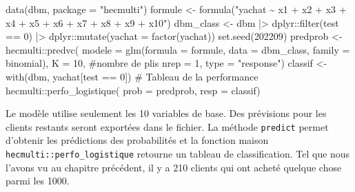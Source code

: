 \documentclass[
  11pt,
  letterpaper,
]{scrbook}
\newenvironment{Shaded}{\begin{snugshade}}{\end{snugshade}}
\newcommand{\AttributeTok}[1]{\textcolor[rgb]{0.40,0.45,0.13}{#1}}
\newcommand{\CommentTok}[1]{\textcolor[rgb]{0.37,0.37,0.37}{#1}}
\newcommand{\DecValTok}[1]{\textcolor[rgb]{0.68,0.00,0.00}{#1}}
\newcommand{\FunctionTok}[1]{\textcolor[rgb]{0.28,0.35,0.67}{#1}}
\newcommand{\NormalTok}[1]{\textcolor[rgb]{0.00,0.23,0.31}{#1}}
\newcommand{\OtherTok}[1]{\textcolor[rgb]{0.00,0.23,0.31}{#1}}
\newcommand{\SpecialCharTok}[1]{\textcolor[rgb]{0.37,0.37,0.37}{#1}}
\newcommand{\StringTok}[1]{\textcolor[rgb]{0.13,0.47,0.30}{#1}}
\theoremstyle{definition}
\theoremstyle{remark}
\begin{document}
\begin{Shaded}
\begin{Highlighting}[]
\FunctionTok{data}\NormalTok{(dbm, }\AttributeTok{package =} \StringTok{"hecmulti"}\NormalTok{)}
\NormalTok{formule }\OtherTok{\textless{}{-}} \FunctionTok{formula}\NormalTok{(}\StringTok{"yachat \textasciitilde{} x1 + x2 + x3 +}
\StringTok{                x4 + x5 + x6 + x7 + x8 + x9 + x10"}\NormalTok{)}
\NormalTok{dbm\_class }\OtherTok{\textless{}{-}}\NormalTok{ dbm }\SpecialCharTok{|\textgreater{}}
\NormalTok{  dplyr}\SpecialCharTok{::}\FunctionTok{filter}\NormalTok{(test }\SpecialCharTok{==} \DecValTok{0}\NormalTok{) }\SpecialCharTok{|\textgreater{}}
\NormalTok{  dplyr}\SpecialCharTok{::}\FunctionTok{mutate}\NormalTok{(}\AttributeTok{yachat =} \FunctionTok{factor}\NormalTok{(yachat))}
\FunctionTok{set.seed}\NormalTok{(}\DecValTok{202209}\NormalTok{)}
\NormalTok{predprob }\OtherTok{\textless{}{-}}\NormalTok{ hecmulti}\SpecialCharTok{::}\FunctionTok{predvc}\NormalTok{(}
  \AttributeTok{modele =} \FunctionTok{glm}\NormalTok{(}\AttributeTok{formula =}\NormalTok{ formule, }
               \AttributeTok{data =}\NormalTok{ dbm\_class, }
               \AttributeTok{family =}\NormalTok{ binomial),}
  \AttributeTok{K =} \DecValTok{10}\NormalTok{, }\CommentTok{\#nombre de plis}
  \AttributeTok{nrep =} \DecValTok{1}\NormalTok{,}
  \AttributeTok{type =} \StringTok{"response"}\NormalTok{)}
\NormalTok{classif }\OtherTok{\textless{}{-}} \FunctionTok{with}\NormalTok{(dbm, yachat[test }\SpecialCharTok{==} \DecValTok{0}\NormalTok{])}
\CommentTok{\# Tableau de la performance}
\NormalTok{hecmulti}\SpecialCharTok{::}\FunctionTok{perfo\_logistique}\NormalTok{(}
  \AttributeTok{prob =}\NormalTok{ predprob,}
  \AttributeTok{resp =}\NormalTok{ classif)}
\end{Highlighting}
\end{Shaded}

Le modèle utilise seulement les 10 variables de base. Des prévisions
pour les clients restants seront exportées dans le fichier. La méthode
\texttt{predict} permet d'obtenir les prédictions des probabilités et la
fonction maison \texttt{hecmulti::perfo\_logistique} retourne un tableau
de classification. Tel que nous l'avons vu au chapitre précédent, il y a
210 clients qui ont acheté quelque chose parmi les 1000.
\end{document}
